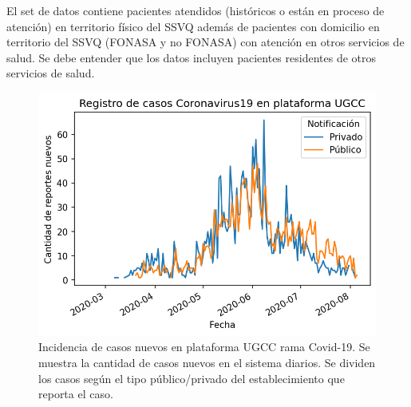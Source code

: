 \documentclass{article}
\begin{document}
El set de datos contiene pacientes atendidos (históricos o están en proceso de atención) en territorio físico del SSVQ además de pacientes con domicilio en territorio del SSVQ (FONASA y no FONASA) con atención en otros servicios de salud. Se debe entender que los datos incluyen pacientes residentes de otros servicios de salud.




\begin{figure}
	\centering
	\begin{adjustbox}{width=0.6\textwidth}
		\includegraphics{./figuras/casosnuevosUGCC.png} %
	\end{adjustbox}
	\caption{Incidencia de casos nuevos en plataforma UGCC rama Covid-19. Se muestra la cantidad de casos nuevos en el sistema diarios. Se dividen los casos según el tipo público/privado del establecimiento que reporta el caso.}
	\label{fig:movilidad mundial_DS}
\end{figure}




\medskip
\end{document}
